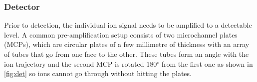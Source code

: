 




\subsubsection{Detector}
Prior to detection, the individual ion signal needs to be amplified to a detectable level. A common pre-amplification setup consists of two microchannel plates (MCPs), which are circular plates of a few millimetre of thickness with an array of tubes that go from one face to the other. These tubes form an angle with the ion trajectory and the second MCP is rotated 180$^{\circ}$ from the first one as shown in \autoref{fig:det} so ions cannot go through without hitting the plates.

